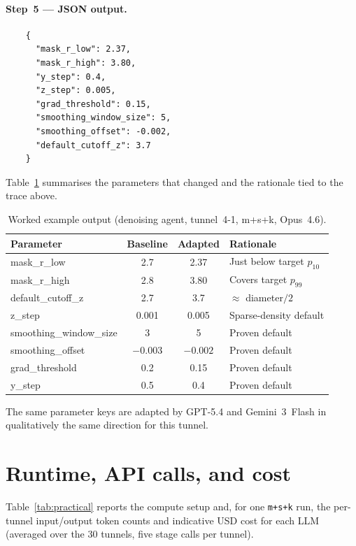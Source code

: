 \paragraph{Step~5 --- JSON output.}
\begin{verbatim}
    {
      "mask_r_low": 2.37,
      "mask_r_high": 3.80,
      "y_step": 0.4,
      "z_step": 0.005,
      "grad_threshold": 0.15,
      "smoothing_window_size": 5,
      "smoothing_offset": -0.002,
      "default_cutoff_z": 3.7
    }
\end{verbatim}

Table~\ref{tab:cot-example} summarises the parameters that changed and the rationale tied to the trace above.

\begin{table}[ht]
\caption{Worked example output (denoising agent, tunnel~4-1, m+s+k, Opus~4.6).}\label{tab:cot-example}
\begin{tabular*}{\tblwidth}{@{} l c c l @{}}
\toprule
Parameter & Baseline & Adapted & Rationale \\
\midrule
mask\_r\_low & 2.7 & 2.37 & Just below target $p_{10}$ \\
mask\_r\_high & 2.8 & 3.80 & Covers target $p_{99}$ \\
default\_cutoff\_z & 2.7 & 3.7 & $\approx$ diameter$/2$ \\
z\_step & 0.001 & 0.005 & Sparse-density default \\
smoothing\_window\_size & 3 & 5 & Proven default \\
smoothing\_offset & $-0.003$ & $-0.002$ & Proven default \\
grad\_threshold & 0.2 & 0.15 & Proven default \\
y\_step & 0.5 & 0.4 & Proven default \\
\bottomrule
\end{tabular*}
\end{table}

The same parameter keys are adapted by GPT-5.4 and Gemini~3~Flash in qualitatively the same direction for this tunnel.


\section{Runtime, API calls, and cost}\label{app:practical}
Table~\ref{tab:practical} reports the compute setup and, for one \texttt{m+s+k} run, the per-tunnel input/output token counts and indicative USD cost for each LLM (averaged over the 30 tunnels, five stage calls per tunnel).

